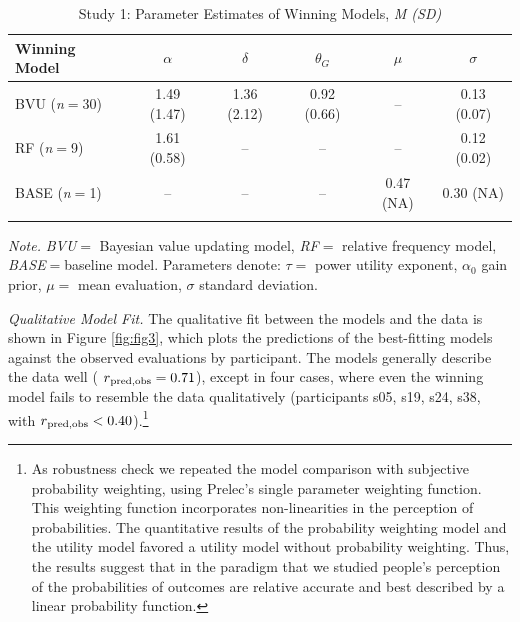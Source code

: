 \documentclass[
  a4paper, man, floatsintext]{apa6}
\begin{document}
\begin{table}[tbp]

\begin{center}
\begin{threeparttable}

\caption{\label{tab:study1_parameter}Study 1: Parameter Estimates of Winning Models, \textit{M (SD)}}

\begin{tabular}{lccccc}
\toprule
Winning Model & $\alpha$ & $\delta$ & $\theta_G$ & $\mu$ & $\sigma$\\
\midrule
BVU (\textit{n}$=$30) & 1.49 (1.47) & 1.36 (2.12) & 0.92 (0.66) & -- & 0.13 (0.07)\\
RF (\textit{n}$=$9) & 1.61 (0.58) & -- & -- & -- & 0.12 (0.02)\\
BASE (\textit{n}$=$1) & -- & -- & -- & 0.47 (NA) & 0.30 (NA)\\
\bottomrule
\addlinespace
\end{tabular}

\begin{tablenotes}[para]
\normalsize{\textit{Note.} \textit{BVU}$=$ Bayesian value updating model, \textit{RF}$=$ relative frequency model, \textit{BASE}$=$baseline model. Parameters denote: $\tau =$ power utility exponent, $\alpha_0$ gain prior, $\mu=$ mean evaluation, $\sigma$ standard deviation.}
\end{tablenotes}

\end{threeparttable}
\end{center}

\end{table}

\textit{Qualitative Model Fit.} The qualitative fit between the models
and the data is shown in Figure \ref{fig:fig3}, which plots the
predictions of the best-fitting models against the observed evaluations
by participant. The models generally describe the data well
( \(r\textsubscript{pred,obs} = 0.71\)),
except in four cases, where even the winning model fails to resemble the
data qualitatively (participants s05, s19, s24, s38, with
\(r\textsubscript{pred,obs} < 0.40\)).\footnote{As robustness check we repeated the model comparison with subjective probability weighting, using Prelec’s \citeyear{Prelec1998} single parameter weighting function. This weighting function incorporates non-linearities in the perception of probabilities. The quantitative results of the probability weighting model and the utility model favored a utility model without probability weighting. Thus, the results suggest that in the paradigm that we studied people's perception of the probabilities of outcomes are relative accurate and best described by a linear probability function.}
\end{document}
